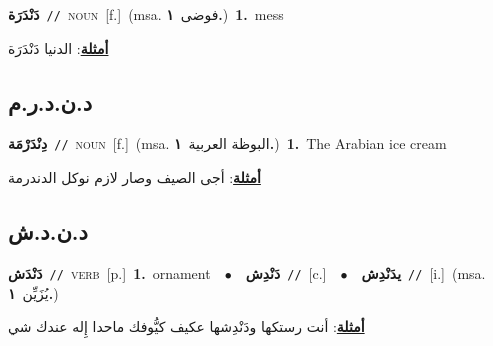 \documentclass[10pt,a4paper,twoside]{article} %
\begin{document}
\begin{multicols}{2}
{\setlength\topsep{0pt}\textbf{\foreignlanguage{arabic}{دَنْدَرَة}}\ {\color{gray}\texttt{//}\color{black}}\ \textsc{noun}\ [f.]\ \color{gray}(msa. \foreignlanguage{arabic}{فوضى}~\foreignlanguage{arabic}{\textbf{١.}})\color{black}\ \textbf{1.}~mess\  \begin{flushright}\color{gray}\foreignlanguage{arabic}{\textbf{\underline{\foreignlanguage{arabic}{أمثلة}}}: الدنيا دَنْدَرَة}\end{flushright}\color{black}} \vspace{2mm}

\vspace{-3mm}
\subsection*{\color{blue}\foreignlanguage{arabic}{د.ن.د.ر.م}\color{blue}{ (ntws)}} 

{\setlength\topsep{0pt}\textbf{\foreignlanguage{arabic}{دِنْدَرْمَة}}\ {\color{gray}\texttt{//}\color{black}}\ \textsc{noun}\ [f.]\ \color{gray}(msa. \foreignlanguage{arabic}{البوظة العربية}~\foreignlanguage{arabic}{\textbf{١.}})\color{black}\ \textbf{1.}~The Arabian ice cream\  \begin{flushright}\color{gray}\foreignlanguage{arabic}{\textbf{\underline{\foreignlanguage{arabic}{أمثلة}}}: أجى الصيف وصار لازم نوكل الدندرمة}\end{flushright}\color{black}} \vspace{2mm}

\vspace{-3mm}
\subsection*{\color{blue}\foreignlanguage{arabic}{د.ن.د.ش}\color{blue}{}} 

{\setlength\topsep{0pt}\textbf{\foreignlanguage{arabic}{دَنْدَش}}\ {\color{gray}\texttt{//}\color{black}}\ \textsc{verb}\ [p.]\ \textbf{1.}~ornament\ \ $\bullet$\ \ \setlength\topsep{0pt}\textbf{\foreignlanguage{arabic}{دَنْدِش}}\ {\color{gray}\texttt{//}\color{black}}\ [c.]\ \ $\bullet$\ \ \setlength\topsep{0pt}\textbf{\foreignlanguage{arabic}{يدَنْدِش}}\ {\color{gray}\texttt{//}\color{black}}\ [i.]\ \color{gray}(msa. \foreignlanguage{arabic}{يُزَيِّن}~\foreignlanguage{arabic}{\textbf{١.}})\color{black}\  \begin{flushright}\color{gray}\foreignlanguage{arabic}{\textbf{\underline{\foreignlanguage{arabic}{أمثلة}}}: أنت رستكها ودَنْدِشها عكيف كيُّوفك ماحدا إِله عندك شي}\end{flushright}\color{black}} \vspace{2mm}


\end{multicols}
\end{document}
